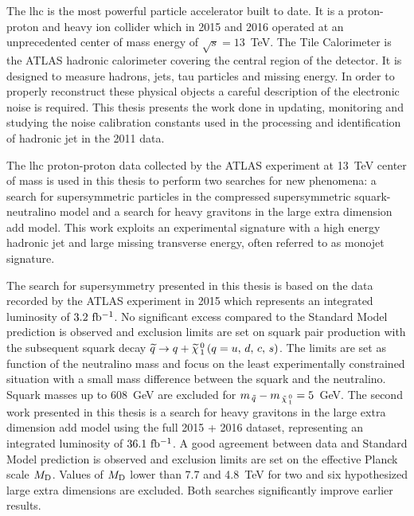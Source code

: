 The \gls{lhc} is the most powerful particle accelerator built to date. It is a
proton-proton and heavy ion collider which in 2015 and 2016 operated at an
unprecedented center of mass energy of $\sqrt{s} = 13$~TeV. The Tile Calorimeter
is the ATLAS hadronic calorimeter covering the central region of the
detector. It is designed to measure hadrons, jets, tau particles and missing
energy. In order to properly reconstruct these physical objects a careful
description of the electronic noise is required. This thesis presents the work
done in updating, monitoring and studying the noise calibration constants used
in the processing and identification of hadronic jet in the 2011 data.

The \gls{lhc} proton-proton data collected by the ATLAS experiment at 13~TeV
center of mass is used in this thesis to perform two searches for new phenomena:
a search for supersymmetric particles in the compressed supersymmetric
squark-neutralino model and a search for heavy gravitons in the large extra
dimension \gls{add} model. This work exploits an experimental signature with a
high energy hadronic jet and large missing transverse energy, often referred to
as monojet signature.

The search for supersymmetry presented in this thesis is based on the data
recorded by the ATLAS experiment in 2015 which represents an integrated
luminosity of $3.2~\mbox{fb$^{-1}$}$. No significant excess compared to the Standard Model
prediction is observed and exclusion limits are set on squark pair production
with the subsequent squark decay $\widetilde{q} \rightarrow q + \widetilde{\chi}_{\, 1}^{\, 0}\, (q = u,\, d,\, c,\, s)$. The limits are set as function
of the neutralino mass and focus on the least experimentally constrained
situation with a small mass difference between the squark and the
neutralino. Squark masses up to 608~GeV are excluded for
$m_{\, \tilde{q}} - m_{\, \tilde{\chi}_{\, 1}^{\, 0}} = 5$~GeV. The second work presented in this thesis is a
search for heavy gravitons in the large extra dimension \gls{add} model using
the full 2015 + 2016 dataset, representing an integrated luminosity of
$36.1~\mbox{fb$^{-1}$}$. A good agreement between data and Standard Model prediction is
observed and exclusion limits are set on the effective Planck scale
$M_\mathrm{D}$. Values of $M_\mathrm{D}$ lower than 7.7 and 4.8~TeV for two and six hypothesized
large extra dimensions are excluded. Both searches significantly improve earlier
results.
